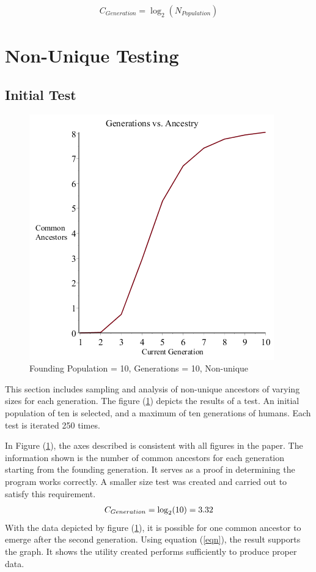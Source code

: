 \documentclass[12pt]{extarticle}
\begin{document}
\begin{align}
\label{eqn}
C_{Generation} = \log_2 (N_{Population})
\end{align}
 
\section{Non-Unique Testing}
\subsection{Initial Test}
\begin{figure}
	\begin{center}
		\includegraphics[scale=0.55]{Graph1.png}
		\caption{\small{Founding Population = 10, Generations = 10, Non-unique}}
		\label{fig:img1}
	\end{center}
\end{figure}
This section includes sampling and analysis of non-unique ancestors of varying sizes for each generation. The figure (\ref{fig:img1}) depicts the results of a test. An initial population of ten is selected, and a maximum of ten generations of humans. Each test is iterated 250 times.

In Figure (\ref{fig:img1}), the axes described is consistent with all figures in the paper. The information shown is the number of common ancestors for each generation starting from the founding generation. It serves as a proof in determining the program works correctly. A smaller size test was created and carried out to satisfy this requirement.
\begin{align}
\notag
C_{Generation} = \log_2(10) = 3.32
\end{align}
\indent With the data depicted by figure (\ref{fig:img1}), it is possible for one common ancestor to emerge after the second generation. Using equation (\ref{eqn}), the result supports the graph. It shows the utility created performs sufficiently to produce proper data.
\end{document}
